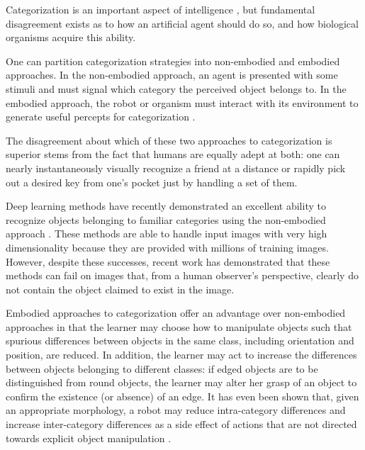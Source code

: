 \documentclass{sig-alternate}
\begin{document}
Categorization is an important aspect of intelligence
\cite{harnad2005cognize}, but
fundamental disagreement exists as to how an artificial agent
should do so, and how biological organisms acquire this ability.

One can partition categorization strategies into non-embodied
and embodied approaches. In the non-embodied approach, an agent
is presented with some stimuli and must signal which category
the perceived object belongs to. In the embodied approach,
the robot or organism must interact with its environment to
generate useful percepts for categorization
\cite{beer2003dynamics,
  bongard2010utility,
  tuci2010active}.

The disagreement
about which of these two approaches to categorization is
superior stems from the fact that humans are equally adept
at both: one can nearly instantaneously visually recognize
a friend at a distance or rapidly pick out a desired
key from one's pocket just by handling a set of them.

Deep learning methods have recently demonstrated an excellent
ability to recognize objects belonging to familiar categories
using the non-embodied approach \cite{bengio2009learning,
hinton2007learning}.
These methods are able to
handle input images with very high dimensionality because they
are provided with millions of training images. However, despite
these successes, recent work
\cite{szegedy2013intriguing, nguyen2014deep}
has demonstrated that these
methods can fail on images that, from a human observer's perspective,
clearly do not contain the object claimed to exist in the image.

Embodied approaches to categorization offer an advantage over
non-embodied approaches in that the
learner may choose how to manipulate objects such
that spurious differences between objects in the same class,
including orientation and position, are reduced.
In addition, the learner may act to increase
the differences between objects belonging to different classes:
if edged objects are to be distinguished from round objects,
the learner may alter her grasp of an object to confirm
the existence (or absence) of an edge.
It has even been shown that, given an appropriate morphology,
a robot may reduce intra-category differences and increase
inter-category differences as a side effect of
actions that are not directed towards explicit object manipulation
\cite{scheier1995classification}.
\end{document}
